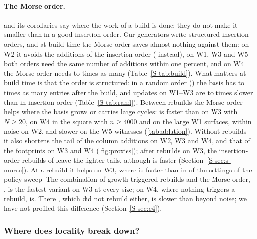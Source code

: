 \paragraph{The Morse order.}
 and its corollaries say where the work of a build is done;
they do not make it smaller than in a good insertion order. Our generators write
structured insertion orders, and at build time the Morse order saves almost
nothing against them: on W2 it avoids the
\NumWTwoNThirtyThreeSEightDrbIdBuildAdds{} additions of the insertion order
(\NumWTwoNThirtyThreeSEightMmhmNorbBuildAdds{} instead), on W1, W3 and W5 both
orders need the same number of additions within one percent, and on W4 the Morse
order needs \NumWFourPlaneNOneThousandDThreeBuildAddsMorseOverId{} to
\NumWFourSpaceNFourThousandDThreeBuildAddsMorseOverId{} times as many
(Table~\ref{S-tab:build}). What matters at build time is that the order is
structured: in a random order
() the basis has
\NumWFourPlaneNFourThousandDTwoNnzInitRandOverId{} to
\NumWThreeNFourteenNnzInitRandOverId{} times as many entries after the build,
and updates on W1--W3 are \NumWThreeNFourteenDrbRandOverDrbIdAmort{} to
\NumWTwoNFifteenSEightDrbRandOverDrbIdAmort{} times slower than in insertion
order (Table~\ref{S-tab:rand}). Between rebuilds the Morse order helps where the
basis grows or carries large cycles:  is faster than
 on W3 with $N\ge20$, on W4 in the square with $n\ge4000$ and on
the large W1 surfaces, within noise on W2, and slower on the W5 witnesses
(\cref{tab:ablation}). Without rebuilds it also shortens the tail of the column
additions on W2, W3 and W4, and that of the footprints on W3 and W4
(\cref{fig:proxies}); after rebuilds on W3, the insertion-order rebuilds of
 leave the lighter tails, although  is faster
(Section~\ref{S-sec:s-morse}). At a rebuild it helps on W3, where  is
faster than  in \NumESevenWThreeNTwentyMmhmBelowDrbIdRb{} of
the \NumESevenWThreeNTwentySettings{} settings of the policy sweep. The
combination of growth-triggered rebuilds and the Morse order, , is
the fastest variant on W3 at every size; on W4, where nothing triggers a
rebuild,  is. There , which did not rebuild
either, is slower than  beyond noise; we have not profiled
this difference (Section~\ref{S-sec:e4}).

\subsubsection{Where does locality break down?}\label{sec:exp-limits}

